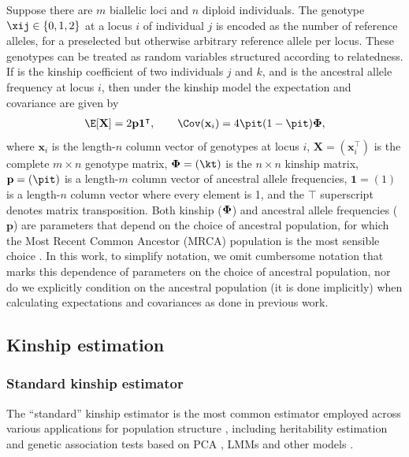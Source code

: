 \documentclass[11pt]{article}
\newcommand{\kinMat}{%
  \ensuremath{%
    \mathbf{\Phi}
  }%
  \xspace%
}%
\begin{document}
Suppose there are $m$ biallelic loci and $n$ diploid individuals.
The genotype $\xij \in \{0,1,2\}$ at a locus $i$ of individual $j$ is encoded as the number of reference alleles, for a preselected but otherwise arbitrary reference allele per locus.
These genotypes can be treated as random variables structured according to relatedness.
If \kt is the kinship coefficient of two individuals $j$ and $k$, and \pit is the ancestral allele frequency at locus $i$, then under the kinship model \citep{ochoa_estimating_2021} the expectation and covariance are given by
\begin{align*}
  \E[\mathbf{X}]
  =
    2 \mathbf{p} \mathbf{1}^\intercal
  ,
  \quad\quad
  \Cov(\mathbf{x}_i)
  =
    4 \pit (1-\pit) \kinMat
    ,
\end{align*}
where $\mathbf{x}_i$ is the length-$n$ column vector of genotypes at locus $i$, $\mathbf{X} = (\mathbf{x}_i^\intercal)$ is the complete $m \times n$ genotype matrix, $\kinMat = (\kt)$ is the $n \times n$ kinship matrix, $\mathbf{p} = (\pit)$ is a length-$m$ column vector of ancestral allele frequencies, $\mathbf{1} = (1)$ is a length-$n$ column vector where every element is 1, and the $\intercal$ superscript denotes matrix transposition.
Both kinship ($\kinMat$) and ancestral allele frequencies ($\mathbf{p}$) are parameters that depend on the choice of ancestral population, for which the Most Recent Common Ancestor (MRCA) population is the most sensible choice \citep{ochoa_estimating_2021}.
In this work, to simplify notation, we omit cumbersome notation that marks this dependence of parameters on the choice of ancestral population, nor do we explicitly condition on the ancestral population (it is done implicitly) when calculating expectations and covariances as done in previous work.

\subsection{Kinship estimation}

\subsubsection{Standard kinship estimator}

The ``standard'' kinship estimator is the most common estimator employed across various applications for population structure \citep{astle_population_2009, yang_advantages_2014, speed_relatedness_2015, wang_efficient_2017}, including
heritability estimation \citep{speed_improved_2012, yang_advantages_2014, speed_relatedness_2015, speed_reevaluation_2017}
and genetic association tests based on PCA \citep{price_principal_2006},
LMMs \citep{astle_population_2009, zhou_genome-wide_2012, yang_advantages_2014, loh_efficient_2015, sul_population_2018}
and other models \citep{rakovski_kinship-based_2009, thornton_roadtrips:_2010}.
\end{document}
